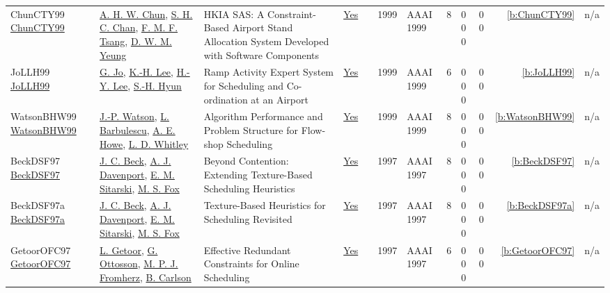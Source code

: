 {\begin{longtable}{>{\raggedright\arraybackslash}p{3cm}>{\raggedright\arraybackslash}p{4.5cm}>{\raggedright\arraybackslash}p{6.0cm}rrrp{2.5cm}rp{1cm}p{1cm}rr}
ChunCTY99 \href{http://www.aaai.org/Library/IAAI/1999/iaai99-111.php}{ChunCTY99} & \hyperref[auth:a1323]{A. H. W. Chun}, \hyperref[auth:a1324]{S. H. C. Chan}, \hyperref[auth:a1325]{F. M. F. Tsang}, \hyperref[auth:a1326]{D. W. M. Yeung} & {HKIA} {SAS:} {A} Constraint-Based Airport Stand Allocation System Developed with Software Components & \href{../works/ChunCTY99.pdf}{Yes} & \cite{ChunCTY99} & 1999 & AAAI 1999 & 8 & 0 0 0 & 0 0 & \ref{b:ChunCTY99} & n/a\\
JoLLH99 \href{http://www.aaai.org/Library/IAAI/1999/iaai99-114.php}{JoLLH99} & \hyperref[auth:a1319]{G. Jo}, \hyperref[auth:a1320]{K.-H. Lee}, \hyperref[auth:a1321]{H.-Y. Lee}, \hyperref[auth:a1322]{S.-H. Hyun} & Ramp Activity Expert System for Scheduling and Co-ordination at an Airport & \href{../works/JoLLH99.pdf}{Yes} & \cite{JoLLH99} & 1999 & AAAI 1999 & 6 & 0 0 0 & 0 0 & \ref{b:JoLLH99} & n/a\\
WatsonBHW99 \href{http://www.aaai.org/Library/AAAI/1999/aaai99-098.php}{WatsonBHW99} & \hyperref[auth:a360]{J.-P. Watson}, \hyperref[auth:a1315]{L. Barbulescu}, \hyperref[auth:a1316]{A. E. Howe}, \hyperref[auth:a1317]{L. D. Whitley} & Algorithm Performance and Problem Structure for Flow-shop Scheduling & \href{../works/WatsonBHW99.pdf}{Yes} & \cite{WatsonBHW99} & 1999 & AAAI 1999 & 8 & 0 0 0 & 0 0 & \ref{b:WatsonBHW99} & n/a\\
BeckDSF97 \href{http://www.aaai.org/Library/AAAI/1997/aaai97-037.php}{BeckDSF97} & \hyperref[auth:a89]{J. C. Beck}, \hyperref[auth:a248]{A. J. Davenport}, \hyperref[auth:a1288]{E. M. Sitarski}, \hyperref[auth:a302]{M. S. Fox} & Beyond Contention: Extending Texture-Based Scheduling Heuristics & \href{../works/BeckDSF97.pdf}{Yes} & \cite{BeckDSF97} & 1997 & AAAI 1997 & 8 & 0 0 0 & 0 0 & \ref{b:BeckDSF97} & n/a\\
BeckDSF97a \href{http://www.aaai.org/Library/AAAI/1997/aaai97-038.php}{BeckDSF97a} & \hyperref[auth:a89]{J. C. Beck}, \hyperref[auth:a248]{A. J. Davenport}, \hyperref[auth:a1288]{E. M. Sitarski}, \hyperref[auth:a302]{M. S. Fox} & Texture-Based Heuristics for Scheduling Revisited & \href{../works/BeckDSF97a.pdf}{Yes} & \cite{BeckDSF97a} & 1997 & AAAI 1997 & 8 & 0 0 0 & 0 0 & \ref{b:BeckDSF97a} & n/a\\
GetoorOFC97 \href{http://www.aaai.org/Library/AAAI/1997/aaai97-047.php}{GetoorOFC97} & \hyperref[auth:a1293]{L. Getoor}, \hyperref[auth:a852]{G. Ottosson}, \hyperref[auth:a1294]{M. P. J. Fromherz}, \hyperref[auth:a1295]{B. Carlson} & Effective Redundant Constraints for Online Scheduling & \href{../works/GetoorOFC97.pdf}{Yes} & \cite{GetoorOFC97} & 1997 & AAAI 1997 & 6 & 0 0 0 & 0 0 & \ref{b:GetoorOFC97} & n/a\\

\end{longtable}}
